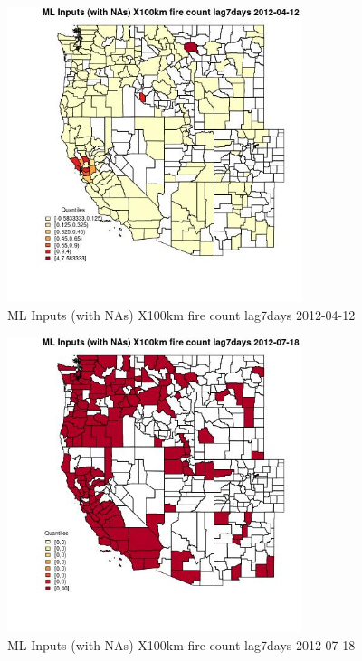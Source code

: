 \begin{figure} 
\centering  
\includegraphics[width=0.77\textwidth]{Code_Outputs/Report_ML_input_PM25_Step4_part_e_de_duplicated_aves_compiled_2019-05-14wNAs_CountyX100km_fire_count_lag7daysMean2012-04-12_2012-04-12.jpg} 
\caption{\label{fig:Report_ML_input_PM25_Step4_part_e_de_duplicated_aves_compiled_2019-05-14wNAsCountyX100km_fire_count_lag7daysMean2012-04-12_2012-04-12}ML Inputs (with NAs) X100km fire count lag7days 2012-04-12} 
\end{figure} 
 

\begin{figure} 
\centering  
\includegraphics[width=0.77\textwidth]{Code_Outputs/Report_ML_input_PM25_Step4_part_e_de_duplicated_aves_compiled_2019-05-14wNAs_CountyX100km_fire_count_lag7daysMean2012-07-18_2012-07-18.jpg} 
\caption{\label{fig:Report_ML_input_PM25_Step4_part_e_de_duplicated_aves_compiled_2019-05-14wNAsCountyX100km_fire_count_lag7daysMean2012-07-18_2012-07-18}ML Inputs (with NAs) X100km fire count lag7days 2012-07-18} 
\end{figure} 
 


